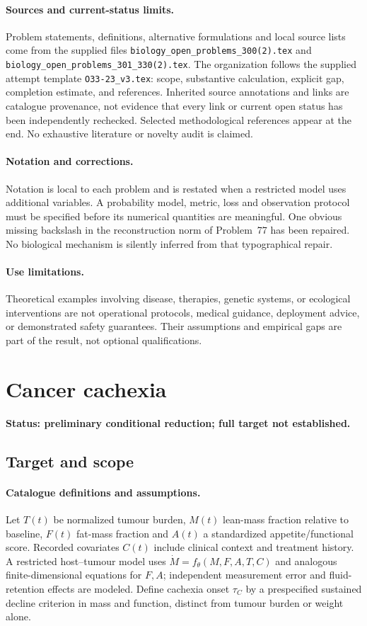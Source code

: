 \documentclass[11pt]{article}
\begin{document}
\paragraph{Sources and current-status limits.}
Problem statements, definitions, alternative formulations and local source lists
come from the supplied files
\texttt{biology\_open\_problems\_300(2).tex} and
\texttt{biology\_open\_problems\_301\_330(2).tex}.
The organization follows the supplied attempt template
\texttt{O33-23\_v3.tex}: scope, substantive calculation, explicit gap,
completion estimate, and references. Inherited source annotations and links are
catalogue provenance, not evidence that every link or current open status has
been independently rechecked. Selected methodological references appear at the
end. No exhaustive literature or novelty audit is claimed.

\paragraph{Notation and corrections.}
Notation is local to each problem and is restated when a restricted model uses
additional variables. A probability model, metric, loss and observation protocol
must be specified before its numerical quantities are meaningful. One obvious
missing backslash in the reconstruction norm of Problem~77 has been repaired.
No biological mechanism is silently inferred from that typographical repair.

\paragraph{Use limitations.}
Theoretical examples involving disease, therapies, genetic systems, or ecological
interventions are not operational protocols, medical guidance, deployment advice,
or demonstrated safety guarantees. Their assumptions and empirical gaps are part
of the result, not optional qualifications.


\section*{Cancer cachexia}
\label{prob:248}
\noindent\textbf{Status: preliminary conditional reduction; full target not established.}
\subsection{Target and scope}
\paragraph{Catalogue definitions and assumptions.}
Let $T(t)$ be normalized tumour burden, $M(t)$ lean-mass fraction relative to baseline, $F(t)$ fat-mass fraction and $A(t)$ a standardized appetite/functional score. Recorded covariates $C(t)$ include clinical context and treatment history. A restricted host--tumour model uses $\dot M=f_\theta(M,F,A,T,C)$ and analogous finite-dimensional equations for $F,A$; independent measurement error and fluid-retention effects are modeled. Define cachexia onset $\tau_C$ by a prespecified sustained decline criterion in mass and function, distinct from tumour burden or weight alone.
\end{document}
